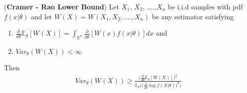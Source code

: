 \documentclass[12pt]{report}
\begin{document}
\begin{thm}(\textbf{Cramer - Rao Lower Bound})
Let $X_1$, $X_2$, ....,$X_n$ be i.i.d samples with pdf $f(x | \theta)$ and let $W(X) = W(X_1, X_2,....,X_n)$ be any estimator satisfying
\begin{enumerate}
\item $\frac{d}{d\theta}\mathbb{E}_\theta[W(X)] = \int_{\mathbb{R}^n} \frac{\partial}{\partial \theta}[W(x) f(x | \theta)] dx$ and 
\item $Var_\theta(W(X)) < \infty$ 
\end{enumerate}
Then 
\begin{align*}
Var_\theta(W(X)) \geq \frac{\Big(\frac{d}{d\theta}\mathbb{E}_\theta[W(X)] \Big)^2}{\mathbb{E}_\theta \Big(\big(\frac{\partial}{\partial \theta} \log f(X | \theta)\big)^2\Big)}
\end{align*}
\end{thm}
\end{document}
